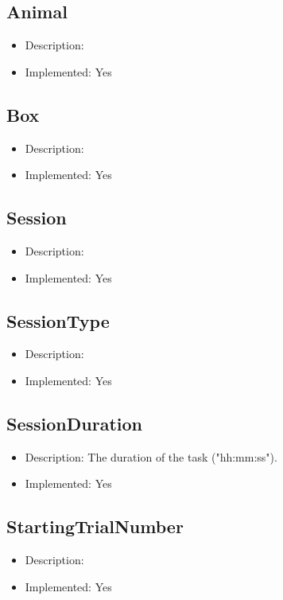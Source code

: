 \subsection*{Animal}
\begin{itemize}
	\item Description: 
	\item Implemented: Yes
\end{itemize}

\subsection*{Box}
\begin{itemize}
	\item Description: 
	\item Implemented: Yes
\end{itemize}

\subsection*{Session}
\begin{itemize}
	\item Description: 
	\item Implemented: Yes
\end{itemize}

\subsection*{SessionType}
\begin{itemize}
	\item Description: 
	\item Implemented: Yes
\end{itemize}

\subsection*{SessionDuration}
\begin{itemize}
	\item Description: The duration of the task ("hh:mm:ss").
	\item Implemented: Yes
\end{itemize}

\subsection*{StartingTrialNumber}
\begin{itemize}
	\item Description: 
	\item Implemented: Yes
\end{itemize}

